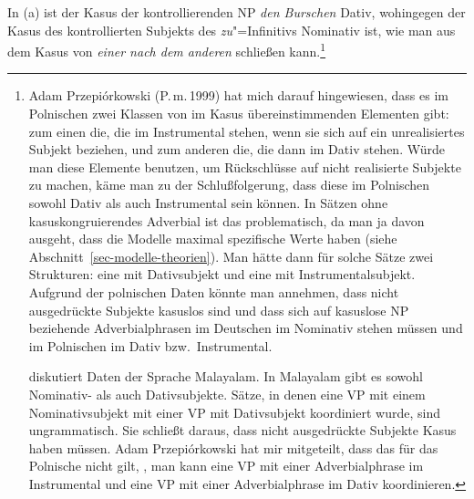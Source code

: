 In (a) ist der Kasus der kontrollierenden NP \emph{den Burschen} Dativ, wohingegen
der Kasus des kontrollierten Subjekts des \emph{zu}"=Infinitivs Nominativ ist,
wie man aus dem Kasus von \emph{einer nach dem anderen} schließen kann.\footnote{
        Adam Przepi{\'o}rkowski (P.\,m.\,1999) hat mich darauf hingewiesen,
        dass es im Polnischen zwei Klassen von im Kasus übereinstimmenden Elementen
        gibt: zum einen die, die im Instrumental stehen, wenn sie sich auf ein
        unrealisiertes Subjekt beziehen, und zum anderen die, die dann im Dativ stehen.
        Würde man diese Elemente benutzen, um Rückschlüsse auf nicht realisierte Subjekte zu
        machen, käme man zu der Schlußfolgerung, dass diese im Polnischen sowohl Dativ als auch Instrumental
        sein können. In Sätzen ohne kasuskongruierendes Adverbial ist das problematisch, da man ja
        davon ausgeht, dass die Modelle maximal spezifische Werte haben (siehe
        Abschnitt~\ref{sec-modelle-theorien}). Man hätte dann für solche Sätze zwei Strukturen: eine
        mit Dativsubjekt und eine mit Instrumentalsubjekt.
        Aufgrund der polnischen Daten könnte man annehmen, dass nicht ausgedrückte Subjekte kasuslos sind
        und dass sich auf kasuslose NP beziehende Adverbialphrasen im Deutschen im Nominativ stehen müssen
        und im Polnischen im Dativ bzw.\ Instrumental.

        \citet{Hennis89} diskutiert Daten der Sprache Malayalam. In
        Malayalam gibt es sowohl Nominativ- als auch Dativsubjekte. Sätze, in denen eine VP mit
        einem Nominativsubjekt mit einer VP mit Dativsubjekt koordiniert wurde, sind ungrammatisch.
        Sie schließt daraus, dass nicht ausgedrückte Subjekte Kasus haben müssen.
        Adam Przepi{\'o}rkowski hat mir mitgeteilt, dass das für das Polnische nicht gilt,
        \dash, man kann eine VP mit einer Adverbialphrase im Instrumental und eine VP
        mit einer Adverbialphrase im Dativ koordinieren.

}
